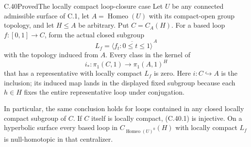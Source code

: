 \begin{claim}{C.40}{Proved}{The locally compact loop-closure case}
Let $U$ be any connected admissible surface of C.1, let
$A=\operatorname{Homeo}(U)$ with its compact-open group
topology, and let $H\leq A$ be arbitrary. Put $C=C_A(H)$.
For a based loop $f:[0,1]\to C$, form the actual closed
subgroup
\[
 L_f=\overline{\langle f_t:0\leq t\leq1\rangle}^{\,A}
\]
with the topology induced from $A$. Every class in the
kernel of
\[
 i_*:\pi_1(C,1)\longrightarrow\pi_1(A,1)^H
                                                        \tag{C.40.1}
\]
that has a representative with locally compact $L_f$
is zero. Here $i:C\hookrightarrow A$ is the inclusion;
its induced map lands in the displayed fixed subgroup
because each $h\in H$ fixes the entire representative
loop under conjugation.

In particular, the same conclusion holds for loops
contained in any closed locally compact subgroup of
$C$. If $C$ itself is locally compact, (C.40.1) is
injective. On a hyperbolic surface every based loop
in $C_{\operatorname{Homeo}(U)^0}(H)$ with locally
compact $L_f$ is null-homotopic in that centralizer.
\end{claim}

